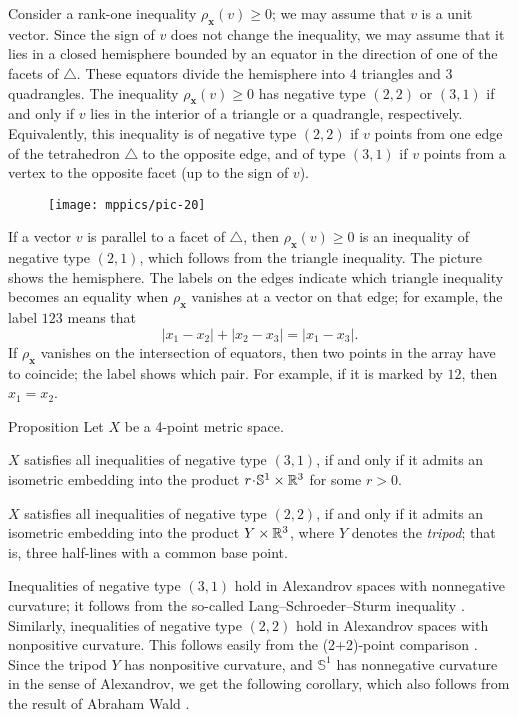 \documentclass[a4paper,10pt]{article}
\begin{document}
Consider a rank-one inequality $\rho_{\bm{x}}(v)\ge 0$; we may assume that $v$ is a unit vector.
Since the sign of $v$ does not change the inequality, we may assume that it lies in a closed hemisphere bounded by an equator in the direction of one of the facets of $\triangle$.
These equators divide the hemisphere into 4 triangles and 3 quadrangles.
The inequality $\rho_{\bm{x}}(v)\ge 0$ has negative type $(2,2)$ or $(3,1)$
if and only if $v$ lies in the interior of a triangle or a quadrangle, respectively.
Equivalently, this inequality is of negative type $(2,2)$ if $v$ points from one edge of the tetrahedron $\triangle$ to the opposite edge, and of type $(3,1)$ if $v$ points from a vertex to the opposite facet (up to the sign of $v$).

\begin{wrapfigure}{o}{36mm}
\centering
\vskip-3mm
\texttt{[image: mppics/pic-20]}
\vskip-0mm
\end{wrapfigure}

If a vector $v$ is parallel to a facet of $\triangle$, then $\rho_{\bm{x}}(v)\ge 0$ is an inequality of negative type $(2,1)$, which follows from the triangle inequality.
The picture shows the hemisphere.
The labels on the edges indicate which triangle inequality becomes an equality when $\rho_{\bm{x}}$ vanishes at a vector on that edge;
for example, the label $123$ means that
\[|x_1-x_2|+|x_2-x_3|=|x_1-x_3|.\]
If $\rho_{\bm{x}}$ vanishes on the intersection of equators, then two points in the array have to coincide;
the label shows which pair.
For example, if it is marked by $12$, then $x_1=x_2$.

\begin{thm}{Proposition}\label{prop:Four-point arrays}
Let $X$ be a 4-point metric space.

$X$ satisfies all inequalities of negative type $(3, 1)$, if and only if it admits an isometric embedding into the product $r\cdot \mathbb{S}^1\times\RR^3$ for some $r>0$.

$X$ satisfies all inequalities of negative type $(2, 2)$, if and only if it admits an isometric embedding into the product $Y\times\mathbb{R}^3$, where $Y$ denotes the \emph{tripod};
that is, three half-lines with a common base point.
\end{thm}

Inequalities of negative type $(3, 1)$ hold in Alexandrov spaces with nonnegative curvature; it follows from the so-called Lang--Schroeder--Sturm inequality \cite{lang-schroeder, sturm}.
Similarly, inequalities of negative type $(2, 2)$ hold in Alexandrov spaces with nonpositive curvature.
This follows easily from the (2+2)-point comparison \cite[9.5]{AKP-2024}.
Since the tripod $Y$ has nonpositive curvature, and $\mathbb{S}^1$ has nonnegative curvature in the sense of Alexandrov, we get the following corollary, which also follows from the result of Abraham Wald \cite[§ 7]{wald}.
\end{document}
